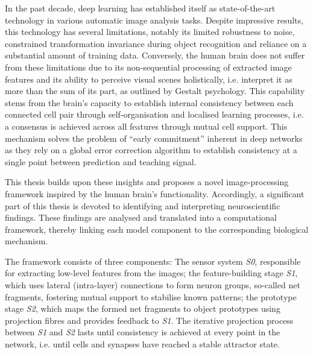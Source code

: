 In the past decade, deep learning has established itself as state-of-the-art technology in various automatic image analysis tasks.
Despite impressive results, this technology has several limitations, notably its limited robustness to noise, constrained transformation invariance during object recognition and reliance on a substantial amount of training data.
Conversely, the human brain does not suffer from these limitations due to its non-sequential processing of extracted image features and its ability to perceive visual scenes holistically, i.e. interpret it as more than the sum of its part, as outlined by Gestalt psychology.
This capability stems from the brain's capacity to establish internal consistency between each connected cell pair through self-organisation and localised learning processes, i.e. a consensus is achieved across all features through mutual cell support. This mechanism solves the problem of ``early commitment'' inherent in deep networks as they rely on a global error correction algorithm to establish consistency at a single point between prediction and teaching signal.

This thesis builds upon these insights and proposes a novel image-processing framework inspired by the human brain's functionality.
Accordingly, a significant part of this thesis is devoted to identifying and interpreting neuroscientific findings.
These findings are analysed and translated into a computational framework, thereby linking each model component to the corresponding biological mechanism.

The framework consists of three components: The sensor system \emph{S0},  responsible for extracting low-level features from the images; the feature-building stage \emph{S1}, which uses lateral (intra-layer) connections to form neuron groups, so-called net fragments,  fostering mutual support to stabilise known patterns; the prototype stage \emph{S2}, which maps the formed net fragments to object prototypes using projection fibres and provides feedback to \emph{S1}.
The iterative projection process between \emph{S1} and \emph{S2} lasts until consistency is achieved at every point in the network, i.e. until cells and synapses have reached a stable attractor state.

